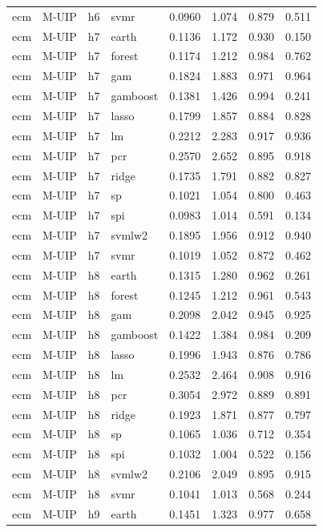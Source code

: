 \begin{ThreePartTable}
\begin{longtable}[t]{llclcccc}
ecm & M-UIP & h6 & svmr & 0.0960 & 1.074 & 0.879 & 0.511\\
\addlinespace
ecm & M-UIP & h7 & earth & 0.1136 & 1.172 & 0.930 & 0.150\\
ecm & M-UIP & h7 & forest & 0.1174 & 1.212 & 0.984 & 0.762\\
ecm & M-UIP & h7 & gam & 0.1824 & 1.883 & 0.971 & 0.964\\
ecm & M-UIP & h7 & gamboost & 0.1381 & 1.426 & 0.994 & 0.241\\
ecm & M-UIP & h7 & lasso & 0.1799 & 1.857 & 0.884 & 0.828\\
ecm & M-UIP & h7 & lm & 0.2212 & 2.283 & 0.917 & 0.936\\
ecm & M-UIP & h7 & pcr & 0.2570 & 2.652 & 0.895 & 0.918\\
ecm & M-UIP & h7 & ridge & 0.1735 & 1.791 & 0.882 & 0.827\\
ecm & M-UIP & h7 & sp & 0.1021 & 1.054 & 0.800 & 0.463\\
ecm & M-UIP & h7 & spi & 0.0983 & 1.014 & 0.591 & 0.134\\
ecm & M-UIP & h7 & svmlw2 & 0.1895 & 1.956 & 0.912 & 0.940\\
ecm & M-UIP & h7 & svmr & 0.1019 & 1.052 & 0.872 & 0.462\\
\addlinespace
ecm & M-UIP & h8 & earth & 0.1315 & 1.280 & 0.962 & 0.261\\
ecm & M-UIP & h8 & forest & 0.1245 & 1.212 & 0.961 & 0.543\\
ecm & M-UIP & h8 & gam & 0.2098 & 2.042 & 0.945 & 0.925\\
ecm & M-UIP & h8 & gamboost & 0.1422 & 1.384 & 0.984 & 0.209\\
ecm & M-UIP & h8 & lasso & 0.1996 & 1.943 & 0.876 & 0.786\\
ecm & M-UIP & h8 & lm & 0.2532 & 2.464 & 0.908 & 0.916\\
ecm & M-UIP & h8 & pcr & 0.3054 & 2.972 & 0.889 & 0.891\\
ecm & M-UIP & h8 & ridge & 0.1923 & 1.871 & 0.877 & 0.797\\
ecm & M-UIP & h8 & sp & 0.1065 & 1.036 & 0.712 & 0.354\\
ecm & M-UIP & h8 & spi & 0.1032 & 1.004 & 0.522 & 0.156\\
ecm & M-UIP & h8 & svmlw2 & 0.2106 & 2.049 & 0.895 & 0.915\\
ecm & M-UIP & h8 & svmr & 0.1041 & 1.013 & 0.568 & 0.244\\
\addlinespace
ecm & M-UIP & h9 & earth & 0.1451 & 1.323 & 0.977 & 0.658\\

\end{longtable}
\end{ThreePartTable}
